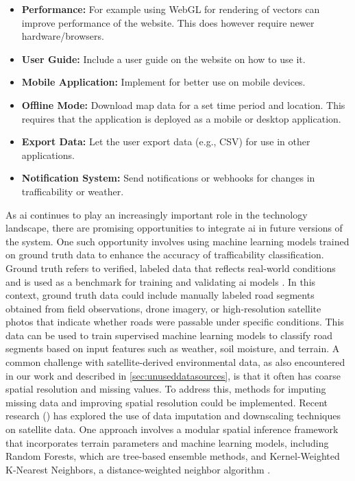 \begin{itemize}
    \item \textbf{Performance:} For example using WebGL for rendering of vectors can improve performance of the website. This does however require newer hardware/browsers.
    \item \textbf{User Guide:} Include a user guide on the website on how to use it.
    \item \textbf{Mobile Application:} Implement for better use on mobile devices.
    \item \textbf{Offline Mode:} Download map data for a set time period and location. This requires that the application is deployed as a mobile or desktop application.
    \item \textbf{Export Data:} Let the user export data (e.g., CSV) for use in other applications.
    \item \textbf{Notification System:} Send notifications or webhooks for changes in trafficability or weather.
\end{itemize}

 As \acrshort{ai} continues to play an increasingly important role in the technology landscape, there are promising opportunities to integrate \acrshort{ai} in future versions of the system. One such opportunity involves using machine learning models trained on ground truth data to enhance the accuracy of trafficability classification. Ground truth refers to verified, labeled data that reflects real-world conditions and is used as a benchmark for training and validating \acrshort{ai} models \cite{ibm_groundtruth}. In this context, ground truth data could include manually labeled road segments obtained from field observations, drone imagery, or high-resolution satellite photos that indicate whether roads were passable under specific conditions. This data can be used to train supervised machine learning models to classify road segments based on input features such as weather, soil moisture, and terrain. A common challenge with satellite-derived environmental data, as also encountered in our work and described in \autoref{sec:unuseddatasources}, is that it often has coarse spatial resolution and missing values. To address this, methods for imputing missing data and improving spatial resolution could be implemented. Recent research (\textcite{satellite_imputation}) has explored the use of data imputation and downscaling techniques on satellite data. One approach involves a modular spatial inference framework that incorporates terrain parameters and machine learning models, including Random Forests, which are tree-based ensemble methods, and Kernel-Weighted K-Nearest Neighbors, a distance-weighted neighbor algorithm \cite{satellite_imputation}.